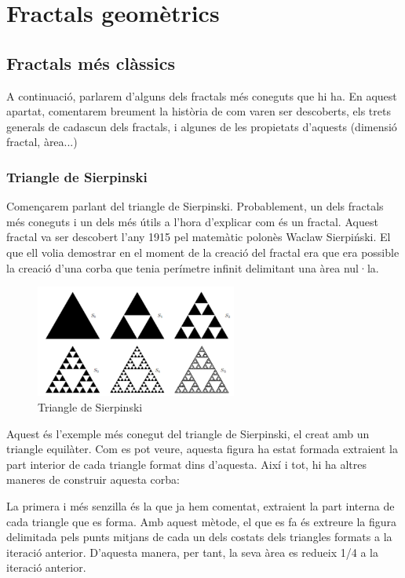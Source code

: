 \documentclass[12pt]{report}
\begin{document}
\chapter{Fractals geomètrics}
\section{Fractals més clàssics} 
A continuació, parlarem d'alguns dels fractals més coneguts que hi ha. En aquest apartat, comentarem breument la història de com varen ser descoberts, els trets generals de cadascun dels fractals, i algunes de les propietats d'aquests (dimensió fractal, àrea...)
\subsection{Triangle de Sierpinski}
Començarem parlant del triangle de Sierpinski. Probablement, un dels fractals més coneguts i un dels més útils a l'hora d'explicar com és un fractal.
\newline
Aquest fractal va ser descobert l'any 1915 pel matemàtic polonès Waclaw Sierpiński. El que ell volia demostrar en el moment de la creació del fractal era que era possible la creació d'una corba que tenia perímetre infinit delimitant una àrea nul·la.
\newline
\begin{figure}
    \centering
   \includegraphics[width=0.59\textwidth]{triangle.PNG}
   \caption{Triangle de Sierpinski}
   \label{fig:my_label}
\end{figure}
Aquest és l'exemple més conegut del triangle de Sierpinski, el creat amb un triangle equilàter. Com es pot veure, aquesta figura ha estat formada extraient la part interior de cada triangle format dins d'aquesta. Així i tot, hi ha altres maneres de construir aquesta corba:

La primera i més senzilla és la que ja hem comentat, extraient la part interna de cada triangle que es forma. Amb aquest mètode, el que es fa és extreure la figura delimitada pels punts mitjans de cada un dels costats dels triangles formats a la iteració anterior. D'aquesta manera, per tant, la seva àrea es redueix 1/4 a la iteració anterior.
\end{document}
